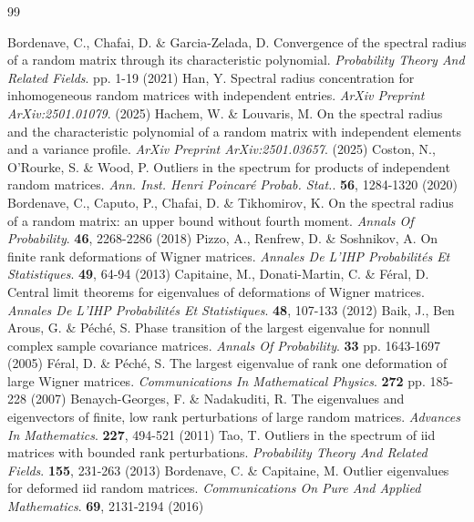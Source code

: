 \documentclass[12pt, reqno]{amsart}
\theoremstyle{definition}
\theoremstyle{remark}
\numberwithin{equation}{section}
\begin{document}

\begin{thebibliography}{99}




Bordenave, C., Chafai, D. \& Garcia-Zelada, D. Convergence of the spectral radius of a random matrix through its characteristic polynomial. {\em Probability Theory And Related Fields}. pp. 1-19 (2021)
Han, Y. Spectral radius concentration for inhomogeneous random matrices with independent entries. {\em ArXiv Preprint ArXiv:2501.01079}. (2025)
Hachem, W. \& Louvaris, M. On the spectral radius and the characteristic polynomial of a random matrix with independent elements and a variance profile. {\em ArXiv Preprint ArXiv:2501.03657}. (2025)
Coston, N., O'Rourke, S. \& Wood, P. Outliers in the spectrum for products of independent random matrices. {\em Ann. Inst. Henri Poincaré Probab. Stat.}. \textbf{56}, 1284-1320 (2020)
Bordenave, C., Caputo, P., Chafai, D. \& Tikhomirov, K. On the spectral radius of a random matrix: an upper bound without fourth moment. {\em Annals Of Probability}. \textbf{46}, 2268-2286 (2018)
Pizzo, A., Renfrew, D. \& Soshnikov, A. On finite rank deformations of Wigner matrices. {\em Annales De L'IHP Probabilités Et Statistiques}. \textbf{49}, 64-94 (2013)
Capitaine, M., Donati-Martin, C. \& Féral, D. Central limit theorems for eigenvalues of deformations of Wigner matrices. {\em Annales De L'IHP Probabilités Et Statistiques}. \textbf{48}, 107-133 (2012)
Baik, J., Ben Arous, G. \& Péché, S. Phase transition of the largest eigenvalue for nonnull complex sample covariance matrices. {\em Annals Of Probability}. \textbf{33} pp. 1643-1697 (2005)
Féral, D. \& Péché, S. The largest eigenvalue of rank one deformation of large Wigner matrices. {\em Communications In Mathematical Physics}. \textbf{272} pp. 185-228 (2007)
Benaych-Georges, F. \& Nadakuditi, R. The eigenvalues and eigenvectors of finite, low rank perturbations of large random matrices. {\em Advances In Mathematics}. \textbf{227}, 494-521 (2011)
Tao, T. Outliers in the spectrum of iid matrices with bounded rank perturbations. {\em Probability Theory And Related Fields}. \textbf{155}, 231-263 (2013)
Bordenave, C. \& Capitaine, M. Outlier eigenvalues for deformed iid random matrices. {\em Communications On Pure And Applied Mathematics}. \textbf{69}, 2131-2194 (2016)

\end{thebibliography}
\end{document}
